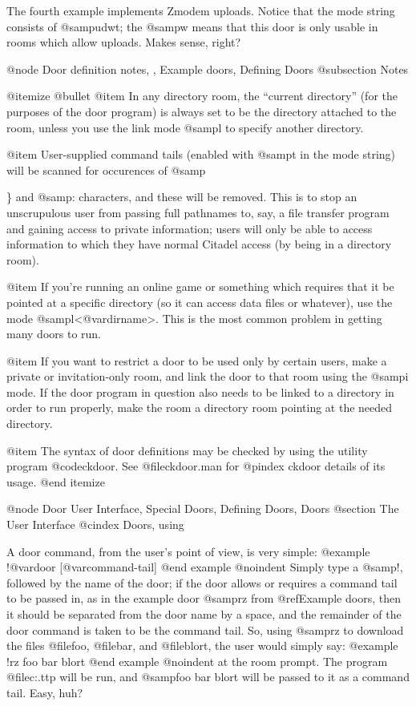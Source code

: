 The fourth example implements Zmodem uploads.  Notice that the
mode string consists of @samp{udwt}; the @samp{w} means that this door
is only usable in rooms which allow uploads.  Makes sense, right?

@node Door definition notes,  , Example doors, Defining Doors
@subsection Notes

@itemize @bullet
@item
In any directory room, the ``current directory'' (for the
purposes of the door program) is always set to be the
directory attached to the room, unless you use the link mode
@samp{l} to specify another directory.

@item
User-supplied command tails (enabled with @samp{t} in the
mode string) will be scanned for occurences of @samp{\}
and @samp{:} characters, and these will be removed.  This
is to stop an unscrupulous user from passing full
pathnames to, say, a file transfer program and gaining
access to private information; users will only be
able to access information to which they have normal
Citadel access (by being in a directory room).

@item
If you're running an online game or something which
requires that it be pointed at a specific directory
(so it can access data files or whatever), use the
mode @samp{l<@var{dirname}>}.  This is the most
common problem in getting many doors to run.

@item
If you want to restrict a door to be used only by certain
users, make a private or invitation-only room, and link the
door to that room using the @samp{i} mode.  If the door program
in question also needs to be linked to a directory in order to
run properly, make the room a directory room pointing at the
needed directory.

@item
The syntax of door definitions may be checked by using
the utility program @code{ckdoor}.  See @file{ckdoor.man} for
@pindex ckdoor
details of its usage.
@end itemize

@node Door User Interface, Special Doors, Defining Doors, Doors
@section The User Interface
@cindex Doors, using

A door command, from the user's point of view, is very simple:
@example
!@var{door} [@var{command-tail}]
@end example
@noindent
Simply type a @samp{!}, followed by the name of the door; if the door
allows or requires a command tail to be passed in, as in the example door
@samp{rz} from
@ref{Example doors}, then it should be separated from the door name by a
space, and the remainder of the door command is taken to be the command
tail.  So, using @samp{rz} to download the files @file{foo}, @file{bar},
and @file{blort},
the user would simply say:
@example
!rz foo bar blort
@end example
@noindent
at the room prompt.  The program @file{c:\bin\rz.ttp} will be run,
and @samp{foo bar blort} will be passed to it as a command tail.  Easy, huh?

}
